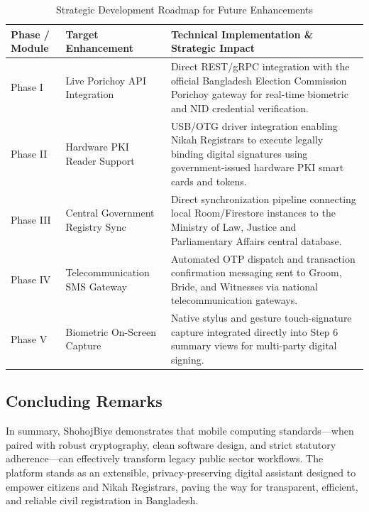 \documentclass[12pt,a4paper]{article}
\begin{document}
	\begin{table}[h!]
		\centering
		\small
		\caption{Strategic Development Roadmap for Future Enhancements}
		\label{tab:future_scope}
		\begin{tabularx}{\textwidth}{@{}l l L@{}}
			\toprule
			\textbf{Phase / Module} & \textbf{Target Enhancement} & \textbf{Technical Implementation \& Strategic Impact} \\ \midrule
			Phase I & Live Porichoy API Integration & Direct REST/gRPC integration with the official Bangladesh Election Commission Porichoy gateway for real-time biometric and NID credential verification. \\ \addlinespace
			Phase II & Hardware PKI Reader Support & USB/OTG driver integration enabling Nikah Registrars to execute legally binding digital signatures using government-issued hardware PKI smart cards and tokens. \\ \addlinespace
			Phase III & Central Government Registry Sync & Direct synchronization pipeline connecting local Room/Firestore instances to the Ministry of Law, Justice and Parliamentary Affairs central database. \\ \addlinespace
			Phase IV & Telecommunication SMS Gateway & Automated OTP dispatch and transaction confirmation messaging sent to Groom, Bride, and Witnesses via national telecommunication gateways. \\ \addlinespace
			Phase V & Biometric On-Screen Capture & Native stylus and gesture touch-signature capture integrated directly into Step 6 summary views for multi-party digital signing. \\ \bottomrule
		\end{tabularx}
	\end{table}
	
	\subsection{Concluding Remarks}
	In summary, ShohojBiye demonstrates that mobile computing standards---when paired with robust cryptography, clean software design, and strict statutory adherence---can effectively transform legacy public sector workflows. The platform stands as an extensible, privacy-preserving digital assistant designed to empower citizens and Nikah Registrars, paving the way for transparent, efficient, and reliable civil registration in Bangladesh.
	
\end{document}
